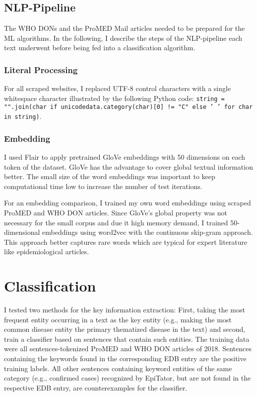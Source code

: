 \subsection{NLP-Pipeline}
  The WHO DONs and the ProMED Mail articles needed to be prepared for the ML algorithms.
  In the following, I describe the steps of the NLP-pipeline each text underwent before being fed into a classification algorithm.

\subsubsection{Literal Processing}
  For all scraped websites, I replaced UTF-8 control characters with a single whitespace character illustrated by the following Python code: \texttt{string = "".join(char if unicodedata.category(char)[0] != "C" else ' ' for char in string)}.

\subsubsection{Embedding}
  I used Flair to apply pretrained GloVe embeddings with 50 dimensions on each token of the dataset. GloVe has the advantage to cover global textual information better. The small size of the word embeddings was important to keep computational time low to increase the number of test iterations.

  For an embedding comparison, I trained my own word embeddings using scraped ProMED and WHO DON articles.
  Since GloVe's global property was not necessary for the small corpus and due it high memory demand, I trained 50-dimensional embeddings using word2vec with the continuous skip-gram approach.
  This approach better captures rare words which are typical for expert literature like epidemiological articles.

\section{Classification}
  I tested two methods for the key information extraction: First, taking the most frequent entity occurring in a text as the key entity (e.g., making the most common disease entity the primary thematized disease in the text) and second, train a classifier based on sentences that contain such entities.
  The training data were all sentences-tokenized ProMED and WHO DON articles of 2018.
  Sentences containing the keywords found in the corresponding EDB entry are the positive training labels.
  All other sentences containing keyword entities of the same category (e.g., confirmed cases) recognized by EpiTator, but are not found in the respective EDB entry, are counterexamples for the classifier.


